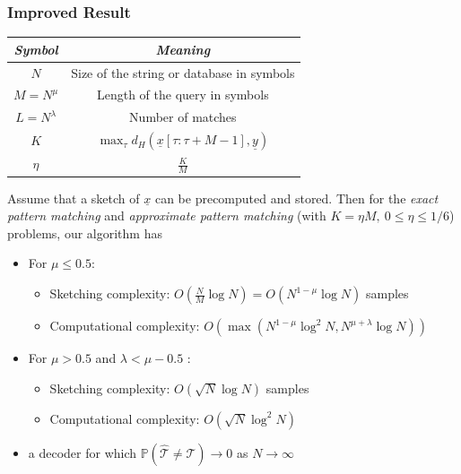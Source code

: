 \documentclass[10pt,xcolor=table]{beamer}
\newcommand{\mbb}{\mathbb}
\newcommand{\xv}{\underline{x}}
\newcommand{\yv}{\underline{y}}
\begin{document}
\begin{frame} \frametitle{Improved Result}
	
	{\small
		\begin{table}[h!]
			\begin{center}
				\begin{tabular}{|c|c|} 	
					\hline		
					\textit{Symbol}		&  \textit{Meaning} \\		
					\hline
					$N$           		& Size of the string or database in symbols \\
					\hline
					$M = N^{\mu}$       & Length of the query in symbols \\
					\hline
					$L = N^\lambda$    &   Number of matches \\
					\hline
					$K$             &$\max_{\tau}d_{H}(\xv[\tau:\tau+M-1],\yv)$\\
					\hline
					$\eta$             &$\frac{K}{M}$\\
					\hline
				\end{tabular}
			\end{center}
		\end{table}
	}	
	
	\vspace{-2.5mm}
	\begin{theorem}
		Assume that a sketch of $\xv$ can be precomputed and stored. Then for the {\it exact pattern matching} and {\it approximate pattern matching} (with $K = \eta M,~ 0 \leq \eta \leq 1/6$) problems, our algorithm has
		\begin{itemize}
		 \item	For $\mu \leq 0.5:$
		\begin{itemize}
			\item \alert{Sketching complexity:} 
			{\color{blue} $O(\frac{N}{M}\log N)=O(N^{1-\mu}\log N)$} \alert{samples}
			\item \alert{Computational complexity:}
			{\color{blue}$O(\max(N^{1-\mu}\log^2 N, N^{\mu+\lambda}\log N ))$}
		\end{itemize}	
		\item	For $\mu > 0.5$ and $\lambda<\mu-0.5$ :

		\begin{itemize}
			\item \alert{Sketching complexity:} 
			{\color{blue} $O(\sqrt{N}\log N)$} samples
			\item \alert{Computational complexity:}
			{\color{blue}$O(\sqrt{N}\log^2 N)$}
		\end{itemize}	
				 		
			\item a decoder for which $\mbb{P}(\hat{{\mathcal{T}}} \neq \mathcal{T}) \rightarrow 0$ as $N \rightarrow \infty$
		\end{itemize}
	\end{theorem}
\end{frame}
\end{document}
